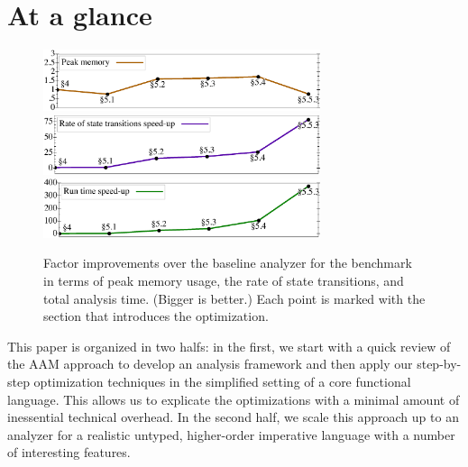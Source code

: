 \documentclass[preprint,onecolumn,9pt]{sigplanconf} %
\begin{document}





\section{At a glance}

\begin{figure}[t]
\begin{center}
\includegraphics[width=3.2in]{church-relative-space.ps}
\includegraphics[width=3.2in]{church-relative-speed.ps}
\includegraphics[width=3.2in]{church-relative-time.ps}
\vspace{-1.5em}
\end{center}
\caption{Factor improvements over the baseline analyzer for the
  \Church{} benchmark in terms of peak memory usage, the rate of state
  transitions, and total analysis time. (Bigger is better.) Each point
  is marked with the section that introduces the optimization.}
\label{fig:churchtime}
\end{figure}


This paper is organized in two halfs: in the first, we start with a
quick review of the AAM approach to develop an analysis framework and
then apply our step-by-step optimization techniques in the simplified
setting of a core functional language.  This allows us to explicate
the optimizations with a minimal amount of inessential technical
overhead.  In the second half, we scale this approach up to an
analyzer for a realistic untyped, higher-order imperative language
with a number of interesting features.
\end{document}
